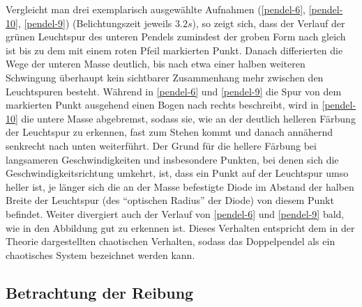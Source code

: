 Vergleicht man drei exemplarisch ausgewählte Aufnahmen (\ref{pendel-6}, \ref{pendel-10}, \ref{pendel-9}) (Belichtungszeit jeweils $3.2s$), so zeigt sich, dass der Verlauf der grünen Leuchtspur des unteren Pendels zumindest der groben Form nach gleich ist bis zu dem mit einem roten Pfeil markierten Punkt. Danach differierten die Wege der unteren Masse deutlich, bis nach etwa einer halben weiteren Schwingung überhaupt kein sichtbarer Zusammenhang mehr zwischen den Leuchtspuren besteht. Während in \ref{pendel-6} und \ref{pendel-9} die Spur von dem markierten Punkt ausgehend einen Bogen nach rechts beschreibt, wird in \ref{pendel-10} die untere Masse abgebremst, sodass sie, wie an der deutlich helleren Färbung der Leuchtspur zu erkennen, fast zum Stehen kommt und danach annähernd senkrecht nach unten weiterführt. Der Grund für die hellere Färbung bei langsameren Geschwindigkeiten und insbesondere Punkten, bei denen sich die Geschwindigkeitsrichtung umkehrt, ist, dass ein Punkt auf der Leuchtspur umso heller ist, je länger sich die an der Masse befestigte Diode im Abstand der halben Breite der Leuchtspur (des \enquote{optischen Radius} der Diode) von diesem Punkt befindet. 
Weiter divergiert auch der Verlauf von \ref{pendel-6} und \ref{pendel-9} bald, wie in den Abbildung gut zu erkennen ist. 
Dieses Verhalten entspricht dem in der Theorie dargestellten chaotischen Verhalten, sodass das Doppelpendel als ein chaotisches System bezeichnet werden kann. 

\subsection{Betrachtung der Reibung}

